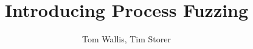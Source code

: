 \title{Introducing Process Fuzzing}
\author{Tom Wallis, Tim Storer}
\date{}


\usepackage{indentfirst}
\usepackage{todonotes}
